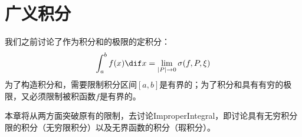\chapter{广义积分}
我们之前讨论了作为积分和的极限的定积分：
\begin{equation*}
	\int_{a}^{b}f(x)\dif x=\lim_{|P|\to0}\sigma(f,P,\xi)
\end{equation*}
为了构造积分和，需要限制积分区间$[a,b]$是有界的；为了积分和具有有穷的极限，又必须限制被积函数$f$是有界的。\par
本章将从两方面突破原有的限制，去讨论\gls{ImproperIntegral}，即讨论具有无穷积分限的积分（无穷限积分）以及无界函数的积分（瑕积分）。


